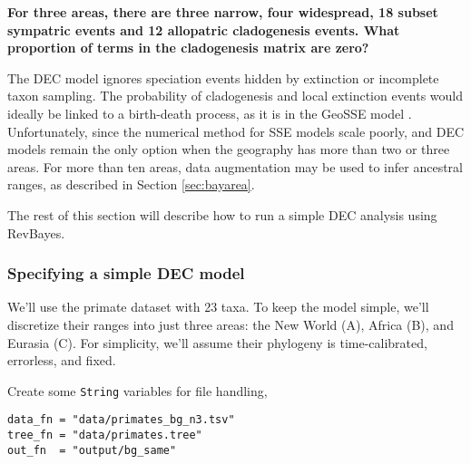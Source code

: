 {\bf {} For three areas, there are three narrow, four widespread, 18 subset sympatric events and 12 allopatric cladogenesis events. What proportion of terms in the cladogenesis matrix are zero?}

The DEC model ignores speciation events hidden by extinction or incomplete taxon sampling.
The probability of cladogenesis and local extinction events would ideally be linked to a birth-death process, as it is in the GeoSSE model \citep{goldberg11}.
Unfortunately, since the numerical method for SSE models scale poorly, and DEC models remain the only option when the geography has more than two or three areas.
For more than ten areas, data augmentation may be used to infer ancestral ranges, as described in Section \ref{sec:bayarea}.


The rest of this section will describe how to run a simple DEC analysis using RevBayes.

\newpage


\subsubsection{Specifying a simple DEC model}

We'll use the primate dataset with 23 taxa. To keep the model simple, we'll discretize their ranges into just three areas: the New World (A), Africa (B), and Eurasia (C).
For simplicity, we'll assume their phylogeny is time-calibrated, errorless, and fixed.

Create some {\tt String} variables for file handling,
\begin{snugshade}
\begin{lstlisting}
data_fn = "data/primates_bg_n3.tsv"
tree_fn = "data/primates.tree"
out_fn  = "output/bg_same"
\end{lstlisting}
\end{snugshade}

